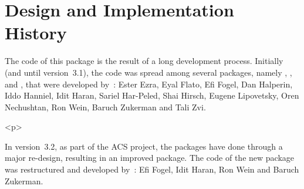 \section*{Design and Implementation History}
%
The code of this package is the result of a long development process.
Initially (and until version~3.1), the code was spread among several
packages, namely , ,
 and , that were
developed by~: \newline
Ester Ezra, Eyal Flato, Efi Fogel, Dan Halperin, Iddo Hanniel, Idit Haran,
Sariel Har-Peled, Shai Hirsch, Eugene Lipovetsky, Oren Nechushtan, Ron Wein,
Baruch Zukerman and Tali Zvi.

\begin{ccHtmlOnly}<p>\end{ccHtmlOnly}
In version~3.2, as part of the ACS project, the packages have done through
a major re-design, resulting in an improved  package.
The code of the new package was restructured and developed by~: \newline
Efi Fogel, Idit Haran, Ron Wein and Baruch Zukerman.
